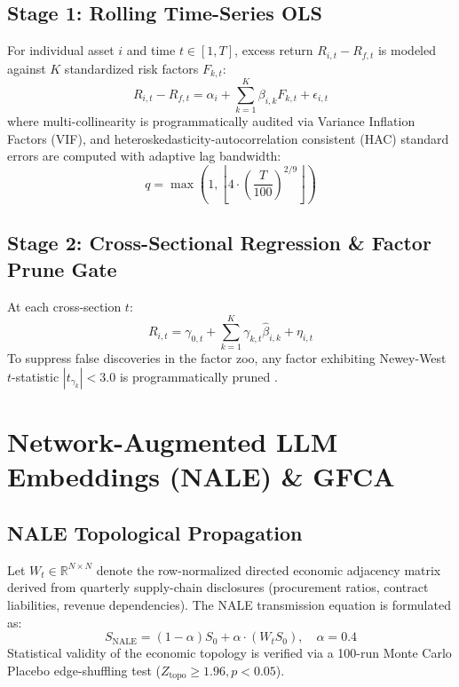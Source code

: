 \documentclass[10pt,journal,compsoc]{IEEEtran}
\begin{document}
\subsection{Stage 1: Rolling Time-Series OLS}
For individual asset $i$ and time $t \in [1, T]$, excess return $R_{i,t} - R_{f,t}$ is modeled against $K$ standardized risk factors $F_{k,t}$:
\begin{equation}
R_{i,t} - R_{f,t} = \alpha_i + \sum_{k=1}^K \beta_{i,k} F_{k,t} + \epsilon_{i,t}
\end{equation}
where multi-collinearity is programmatically audited via Variance Inflation Factors (VIF), and heteroskedasticity-autocorrelation consistent (HAC) standard errors are computed with adaptive lag bandwidth:
\begin{equation}
q = \max\left(1, \left\lfloor 4 \cdot \left(\frac{T}{100}\right)^{2/9} \right\rfloor\right)
\end{equation}

\subsection{Stage 2: Cross-Sectional Regression \& Factor Prune Gate}
At each cross-section $t$:
\begin{equation}
R_{i,t} = \gamma_{0,t} + \sum_{k=1}^K \gamma_{k,t} \hat{\beta}_{i,k} + \eta_{i,t}
\end{equation}
To suppress false discoveries in the factor zoo, any factor exhibiting Newey-West $t$-statistic $|t_{\gamma_k}| < 3.0$ is programmatically pruned \cite{Harvey2016}.

\section{Network-Augmented LLM Embeddings (NALE) \& GFCA}

\subsection{NALE Topological Propagation}
Let $W_t \in \mathbb{R}^{N \times N}$ denote the row-normalized directed economic adjacency matrix derived from quarterly supply-chain disclosures (procurement ratios, contract liabilities, revenue dependencies). The NALE transmission equation is formulated as:
\begin{equation}
S_{\text{NALE}} = (1 - \alpha) S_0 + \alpha \cdot (W_t S_0), \quad \alpha = 0.4
\end{equation}
Statistical validity of the economic topology is verified via a 100-run Monte Carlo Placebo edge-shuffling test ($Z_{\text{topo}} \ge 1.96, p < 0.05$).
\end{document}
